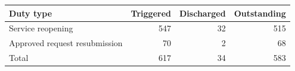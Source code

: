 \begin{tabular}{@{}lrrr@{}}\toprule
Duty type & Triggered & Discharged & Outstanding\\\midrule
Service reopening & 547 & 32 & 515\\
Approved request resubmission & 70 & 2 & 68\\
Total & 617 & 34 & 583\\
\bottomrule
\end{tabular}
